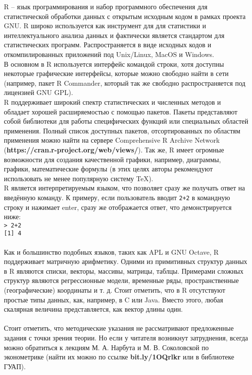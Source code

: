 R – язык программирования и набор программного обеспечения для статистической обработки 
данных с открытым исходным кодом в рамках проекта GNU. R широко используется как 
инструмент для для статистики и интеллектуального анализа данных и фактически является стандартом
для статистических программ. Распространяется в виде исходных кодов и откомпилированных
приложений под Unix/Linux, MacOS и Windows. \\
\indent В основном в R используется интерфейс командой строки, хотя доступны некоторые графические
интерфейсы, которые можно свободно найти в сети (например, пакет R Commander, который так
же свободно распространяется под лицензией GNU GPL). \\ 
\indent R поддерживает широкий спектр статистических и численных методов и обладает хорошей расширяемостью 
с помощью пакетов. Пакеты представляют собой библиотеки для работы специфических функций или 
специальных областей применения. Полный список доступных пакетов, отсортированных по областям 
применения можно найти на сервере Comprehensive R Archive Network (\textbf{https://cran.r-project.org/web/views/}). Так же, R имеет огромные 
возможности для создания качественной графики, например, диаграммы, графики, математические формулы 
(в этих целях авторы рекомендуют использовать не менее популярную систему TeX). \\
\indent R является интерпретируемым языком, что позволяет сразу же получать ответ на введённую
команду. К примеру, если пользователь вводит \texttt{2+2} в командную строку и нажимает enter, сразу же
отображается ответ, что демонстрируется ниже: \\
\indent \texttt{> 2+2} \\ 
\indent \texttt{[1] 4} \\ \\
\indent Как и большинство подобных языков, таких как APL и GNU Octave, R поддерживает матричную арифметику.
Одними из примитивных структур данных в R являются списки, векторы, массивы, матрицы, таблцы.
Примерами сложных структур являются регрессионные модели, временные ряды, пространственные 
(географические) координаты и т. д. Стоит отметить, что в R отсутствуют простые типы данных, как,
например, в C или Java. Вместо этого, любая скалярная величина представляется, как вектор длины один. \\ \\ 
Стоит отметить, что методические указания не рассматривают предложенные задания с точки 
зрения теории. Но если у читателя возникнут затруднения, всегда можно обратиться к лекциям
М. А. Нарбута и М. В. Соколовской по эконометрике (найти их можно по ссылке \textbf{bit.ly/1OQrlkr} или
в библиотеке ГУАП). 
